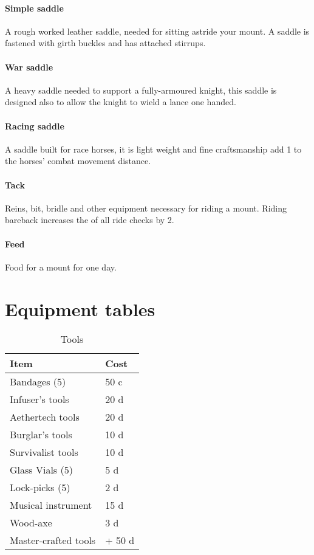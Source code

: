 \documentclass[a4paper,11pt,oneside]{book}
\newcommand{\textlf}[1]{\textbf{\titlecap{#1}}}
\begin{document}
\subsubsection*{Simple saddle}
A rough worked leather saddle, needed for sitting astride your mount. A saddle is fastened with girth buckles and has attached stirrups.

\subsubsection*{War saddle}
A heavy saddle needed to support a fully-armoured knight, this saddle is designed also to allow the knight to wield a lance one handed.

\subsubsection*{Racing saddle}
A saddle built for race horses, it is light weight and fine craftsmanship add 1 to the horses' combat movement distance.

\subsubsection*{Tack}
Reins, bit, bridle and other equipment necessary for riding a mount. Riding bareback increases the \textlf{difficulty} of all ride checks by 2.

\subsubsection*{Feed}
Food for a mount for one day.

\chapter{Equipment tables}
\begin{table}[ht]
	\centering
	\caption{Tools}
	\label{tab:tools}
	\begin{tabular}{|l|l|}
		\hline
		Item & Cost\\ [0.5ex]
		\hline
		Bandages (5)& 50 c\\
		Infuser's tools & 20 d\\
		Aethertech tools & 20 d \\
		Burglar's tools & 10 d \\
		Survivalist tools & 10 d \\
		Glass Vials (5)& 5 d\\
		Lock-picks (5) & 2 d\\
		Musical instrument & 15 d\\
		Wood-axe & 3 d\\		
		\hline
		Master-crafted tools & + 50 d\\
		\hline
	\end{tabular}
\end{table}
\end{document}
